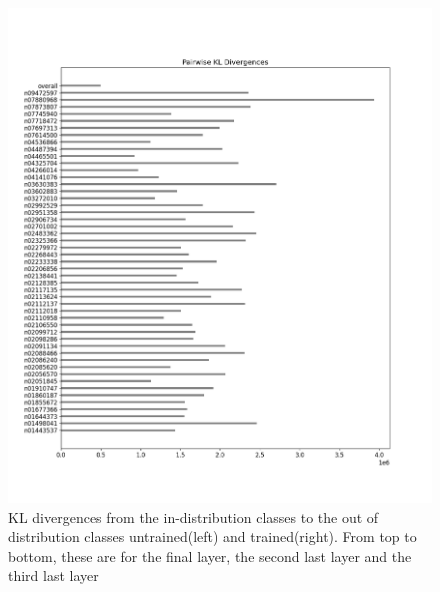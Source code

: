 \documentclass{article}
\begin{document}
\begin{figure}[H]
\begin{minipage}{0.45\textwidth}
        \end{minipage}\hfill
        \begin{minipage}{0.45\textwidth}
            \centering
            \includegraphics[width=\textwidth]{cross_imagenet_imgr_r_third_last/alexnet_kl_div_a_to_bpairwise.png} %
        \end{minipage}
        \caption{KL divergences from the in-distribution classes to the out of distribution classes untrained(left) and trained(right). From top to bottom, these are for the final layer, the second last layer and the third last layer}
        \label{fig:cross_kl_divergence_a_to_b}
        
    \end{figure}
\end{document}
